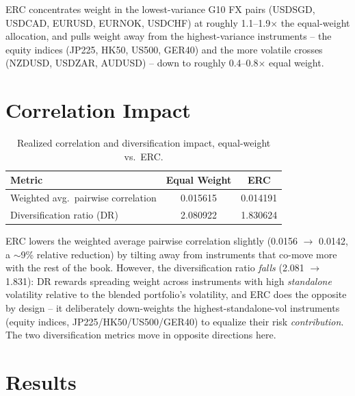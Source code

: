 \documentclass[11pt]{article}
\begin{document}
ERC concentrates weight in the lowest-variance G10 FX pairs (USDSGD, USDCAD, EURUSD,
EURNOK, USDCHF) at roughly 1.1--1.9$\times$ the equal-weight allocation, and pulls
weight away from the highest-variance instruments -- the equity indices (JP225, HK50,
US500, GER40) and the more volatile crosses (NZDUSD, USDZAR, AUDUSD) -- down to
roughly 0.4--0.8$\times$ equal weight.

\section{Correlation Impact}

\begin{table}[h]
\centering
\caption{Realized correlation and diversification impact, equal-weight vs.\ ERC.}
\begin{tabular}{lS[table-format=1.6]S[table-format=1.6]}
\toprule
Metric & {Equal Weight} & {ERC} \\
\midrule
Weighted avg.\ pairwise correlation & 0.015615 & 0.014191 \\
Diversification ratio (DR) & 2.080922 & 1.830624 \\
\bottomrule
\end{tabular}
\end{table}

ERC lowers the weighted average pairwise correlation slightly (0.0156 $\to$ 0.0142,
a $\sim$9\% relative reduction) by tilting away from instruments that co-move more
with the rest of the book. However, the diversification ratio \emph{falls}
(2.081 $\to$ 1.831): DR rewards spreading weight across instruments with high
\emph{standalone} volatility relative to the blended portfolio's volatility, and ERC
does the opposite by design -- it deliberately down-weights the highest-standalone-vol
instruments (equity indices, JP225/HK50/US500/GER40) to equalize their risk
\emph{contribution}. The two diversification metrics move in opposite directions here.

\section{Results}
\end{document}
